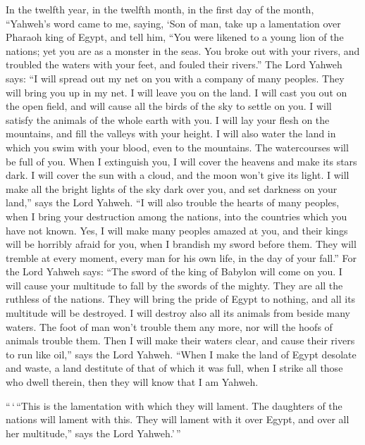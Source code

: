  In the twelfth year, in the twelfth month, in the first
day of the month, ``Yahweh's word came to me, saying, 
`Son of man, take up a lamentation over Pharaoh king of Egypt, and tell
him, ``You were likened to a young lion of the nations; yet you are as a
monster in the seas. You broke out with your rivers, and troubled the
waters with your feet, and fouled their rivers.''  The
Lord Yahweh says: ``I will spread out my net on you with a company of
many peoples. They will bring you up in my net.  I will
leave you on the land. I will cast you out on the open field, and will
cause all the birds of the sky to settle on you. I will satisfy the
animals of the whole earth with you.  I will lay your
flesh on the mountains, and fill the valleys with your height.
 I will also water the land in which you swim with your
blood, even to the mountains. The watercourses will be full of you.
 When I extinguish you, I will cover the heavens and make
its stars dark. I will cover the sun with a cloud, and the moon won't
give its light.  I will make all the bright lights of the
sky dark over you, and set darkness on your land,'' says the Lord
Yahweh.  ``I will also trouble the hearts of many peoples,
when I bring your destruction among the nations, into the countries
which you have not known.  Yes, I will make many peoples
amazed at you, and their kings will be horribly afraid for you, when I
brandish my sword before them. They will tremble at every moment, every
man for his own life, in the day of your fall.''  For the
Lord Yahweh says: ``The sword of the king of Babylon will come on you.
 I will cause your multitude to fall by the swords of the
mighty. They are all the ruthless of the nations. They will bring the
pride of Egypt to nothing, and all its multitude will be destroyed.
 I will destroy also all its animals from beside many
waters. The foot of man won't trouble them any more, nor will the hoofs
of animals trouble them.  Then I will make their waters
clear, and cause their rivers to run like oil,'' says the Lord Yahweh.
 ``When I make the land of Egypt desolate and waste, a
land destitute of that of which it was full, when I strike all those who
dwell therein, then they will know that I am Yahweh.

 ``\,`\,``This is the lamentation with which they will
lament. The daughters of the nations will lament with this. They will
lament with it over Egypt, and over all her multitude,'' says the Lord
Yahweh.'\,''

